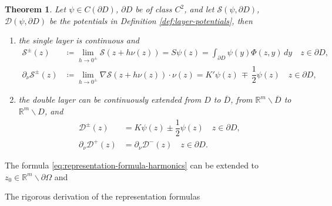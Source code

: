 \documentclass[10pt, a4paper, twoside, openright]{article}
\numberwithin{equation}{section}
\theoremstyle{definition}
\theoremstyle{plain}
\newtheorem{theorem}[subsection]{Theorem}
\theoremstyle{plain}
\theoremstyle{plain}
\theoremstyle{plain}
\theoremstyle{plain}
\theoremstyle{plain}
\theoremstyle{plain}
\theoremstyle{plain}
\begin{document}
\begin{theorem}
\label{theo:jump-relations}
 Let $\psi\in C(\partial D)$, $\partial D$ be of class $C^2$, and let 
 $\mathcal{S}(\psi,\partial D)$, $\mathcal{D}(\psi,\partial D)$ be the potentials in 
 Definition \ref{def:layer-potentials}, then
 \begin{enumerate}
  \item the single layer is continuous and 
  \begin{subequations}
  \begin{align}
   \mathcal{S}^\pm(z) &\coloneqq\lim_{h\to 0^\pm}\mathcal{S}(z+h\nu(z)) = S\psi(z)=\int_{\partial D}\psi(y)\Phi(z,y)\,dy \quad z\in\partial D, \label{eq:single-pm-0}\\
   \partial_\nu\mathcal{S}^\pm(z) &\coloneqq \lim_{h\to0^\pm} \nabla\mathcal{S}(z+h\nu(z))\cdot\nu(z) =  K'\psi(z) \,\mp\,\dfrac{1}{2}\psi(z) \quad z\in\partial D,\label{eq:single-pm-1}
  \end{align}
 \end{subequations}
 \item the double layer can be continuously extended from $D$ to $\overline{D}$, from $\mathbb{R}^m\backslash \overline{D}$ to $\mathbb{R}^m\backslash D$, and
  \begin{subequations}
  \begin{align}
   \mathcal{D}^\pm(z) &= K\psi(z) \pm\dfrac{1}{2}\psi(z)\quad z\in\partial D, \label{eq:double-pm-0}\\
   \partial_\nu\mathcal{D}^+(z) &= \partial_\nu\mathcal{D}^-(z) \quad z\in\partial D. \label{eq:double-pm-1}
  \end{align}
  \end{subequations}
 \end{enumerate}
\end{theorem}


The formula \eqref{eq:representation-formula-harmonics} can be extended to $z_0 \in 
\mathbb{R}^m\backslash\partial\Omega$ and 

The rigorous derivation of the 
representation formulas 

% 

\printbibliography %
\end{document}
